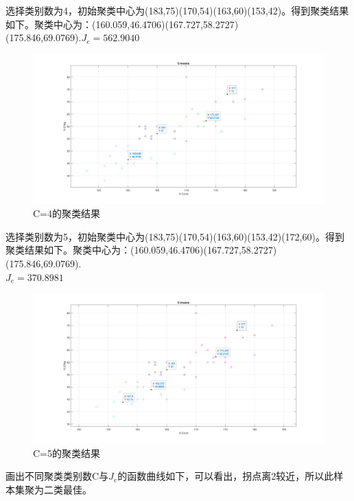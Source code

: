 \documentclass{article}
\begin{document}
选择类别数为4，初始聚类中心为(183,75)(170,54)(163,60)(153,42)。得到聚类结果如下。聚类中心为：(160.059,46.4706)(167.727,58.2727)\\(175.846,69.0769).$J_e = 562.9040$

\begin{figure}[H]
    \centering
    \includegraphics[width=1\textwidth]{image/Figure06.jpg}
    \caption{C=4的聚类结果}
    \label{Figure06}
\end{figure}

选择类别数为5，初始聚类中心为(183,75)(170,54)(163,60)(153,42)(172,60)。得到聚类结果如下。聚类中心为：(160.059,46.4706)(167.727,58.2727)(175.846,69.0769).\\$J_e = 370.8981$

\begin{figure}[H]
    \centering
    \includegraphics[width=1\textwidth]{image/Figure07.jpg}
    \caption{C=5的聚类结果}
    \label{Figure07}
\end{figure}

画出不同聚类类别数C与$J_e$的函数曲线如下，可以看出，拐点离2较近，所以此样本集聚为二类最佳。
\end{document}
